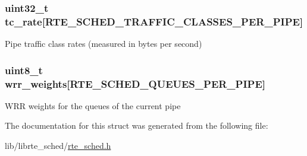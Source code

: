 \subsubsection[{tc\+\_\+rate}]{\setlength{\rightskip}{0pt plus 5cm}uint32\+\_\+t tc\+\_\+rate\mbox{[}{\bf R\+T\+E\+\_\+\+S\+C\+H\+E\+D\+\_\+\+T\+R\+A\+F\+F\+I\+C\+\_\+\+C\+L\+A\+S\+S\+E\+S\+\_\+\+P\+E\+R\+\_\+\+P\+I\+P\+E}\mbox{]}}\label{structrte__sched__pipe__params_a2cf879b3b3815b594057ba4dfcbb13bb}
Pipe traffic class rates (measured in bytes per second) \hypertarget{structrte__sched__pipe__params_a099371854d95799a1e24a258510ad5f5}{}
\subsubsection[{wrr\+\_\+weights}]{\setlength{\rightskip}{0pt plus 5cm}uint8\+\_\+t wrr\+\_\+weights\mbox{[}{\bf R\+T\+E\+\_\+\+S\+C\+H\+E\+D\+\_\+\+Q\+U\+E\+U\+E\+S\+\_\+\+P\+E\+R\+\_\+\+P\+I\+P\+E}\mbox{]}}\label{structrte__sched__pipe__params_a099371854d95799a1e24a258510ad5f5}
W\+R\+R weights for the queues of the current pipe 

The documentation for this struct was generated from the following file\+:\begin{DoxyCompactItemize}
\item 
lib/librte\+\_\+sched/\hyperlink{rte__sched_8h}{rte\+\_\+sched.\+h}\end{DoxyCompactItemize}
